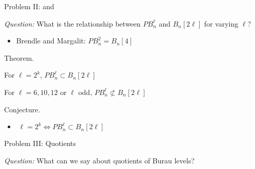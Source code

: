 \documentclass[final]{beamer}
\newlength{\colwidth}
\begin{document}
\begin{frame}[t]
\begin{columns}[t]
\begin{column}{\colwidth}
\begin{block}{
  \begin{huge}
    Problem II:  and 
  \end{huge}}
\begin{huge} \vspace*{5mm}  \emph{Question:} What is the relationship between $PB_n^\ell$ and $B_n[2\ell]$ for varying $\ell$?
\end{huge}

\vspace*{-10mm} 
\begin{huge} \begin{itemize}
\item[]Brendle and Margalit: $PB_n^2 = B_n[4]$
\end{itemize} 

\vspace*{-7mm}
{ \bf{\begin{huge} Theorem. \end{huge}}}

\vspace*{-7mm}
\begin{itemize} \begin{huge}
  \item[] For $\ell = 2^k$, $PB_n^\ell \subset B_n[2\ell]$
  
\item[] For $\ell = 6,10,12$ or $\ell$ odd, $PB_n^\ell \not\subset B_n[2\ell]$
\end{huge}
\end{itemize}
\vspace*{-7mm}

{\bf{\begin{huge} Conjecture. \end{huge}}}
\vspace*{-7mm}
\begin{huge}
\begin{itemize}
  
\item[] $\; \ell = 2^k \iff PB_n^\ell \subset B_n[2\ell]$

\end{itemize}
\end{huge}

\end{huge}

\end{block}

  \begin{block}{
  \begin{huge}
  \vspace*{5mm} 
    Problem III:   Quotients
  \end{huge}} 
 
\begin{huge} \vspace*{5mm}  \emph{Question:} What can we say about quotients of Burau levels? \end{huge}


\end{block}
\end{column}
\end{columns}
\end{frame}
\end{document}
